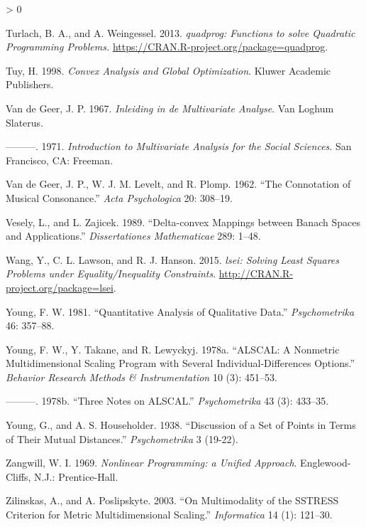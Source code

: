 \documentclass[
  12pt,
]{book}
\newlength{\cslhangindent}
\newenvironment{CSLReferences}[2] %
 {%
  \setlength{\parindent}{0pt}
  \ifodd #1 \everypar{\setlength{\hangindent}{\cslhangindent}}\ignorespaces\fi
  \ifnum #2 > 0
  \setlength{\parskip}{#2\baselineskip}
  \fi
 }%
 {}
\theoremstyle{definition}
\theoremstyle{definition}
\theoremstyle{definition}
\theoremstyle{definition}
\theoremstyle{remark}
\begin{document}
\begin{CSLReferences}{1}{0}
\leavevmode\hypertarget{ref-turlach_weingessel_13}{}%
Turlach, B. A., and A. Weingessel. 2013. \emph{{quadprog: Functions to solve Quadratic Programming Problems.}} \url{https://CRAN.R-project.org/package=quadprog}.

\leavevmode\hypertarget{ref-tuy_98}{}%
Tuy, H. 1998. \emph{Convex Analysis and Global Optimization}. Kluwer Academic Publishers.

\leavevmode\hypertarget{ref-vandegeer_67}{}%
Van de Geer, J. P. 1967. \emph{{Inleiding in de Multivariate Analyse}}. Van Loghum Slaterus.

\leavevmode\hypertarget{ref-vandegeer_71}{}%
---------. 1971. \emph{{Introduction to Multivariate Analysis for the Social Sciences}}. San Francisco, CA: Freeman.

\leavevmode\hypertarget{ref-vandegeer_levelt_plomp_62}{}%
Van de Geer, J. P., W. J. M. Levelt, and R. Plomp. 1962. {``{The Connotation of Musical Consonance}.''} \emph{Acta Psychologica} 20: 308--19.

\leavevmode\hypertarget{ref-vesely_zajicek_89}{}%
Vesely, L., and L. Zajicek. 1989. {``{Delta-convex Mappings between Banach Spaces and Applications}.''} \emph{Dissertationes Mathematicae} 289: 1--48.

\leavevmode\hypertarget{ref-wang_lawson_hanson_15}{}%
Wang, Y., C. L. Lawson, and R. J. Hanson. 2015. \emph{{lsei: Solving Least Squares Problems under Equality/Inequality Constraints}}. \url{http://CRAN.R-project.org/package=lsei}.

\leavevmode\hypertarget{ref-young_81}{}%
Young, F. W. 1981. {``{Quantitative Analysis of Qualitative Data}.''} \emph{Psychometrika} 46: 357--88.

\leavevmode\hypertarget{ref-young_takane_lewyckyj_78a}{}%
Young, F. W., Y. Takane, and R. Lewyckyj. 1978a. {``{ALSCAL: A Nonmetric Multidimensional Scaling Program with Several Individual-Differences Options}.''} \emph{Behavior Research Methods \& Instrumentation} 10 (3): 451--53.

\leavevmode\hypertarget{ref-young_takane_lewyckyj_78b}{}%
---------. 1978b. {``{Three Notes on ALSCAL}.''} \emph{Psychometrika} 43 (3): 433--35.

\leavevmode\hypertarget{ref-young_householder_38}{}%
Young, G., and A. S. Householder. 1938. {``{Discussion of a Set of Points in Terms of Their Mutual Distances}.''} \emph{Psychometrika} 3 (19-22).

\leavevmode\hypertarget{ref-zangwill_69}{}%
Zangwill, W. I. 1969. \emph{{Nonlinear Programming: a Unified Approach}}. Englewood-Cliffs, N.J.: Prentice-Hall.

\leavevmode\hypertarget{ref-zilinskas_podlipskyte_03}{}%
Zilinskas, A., and A. Poslipskyte. 2003. {``{On Multimodality of the SSTRESS Criterion for Metric Multidimensional Scaling}.''} \emph{Informatica} 14 (1): 121--30.

\end{CSLReferences}
\end{document}

